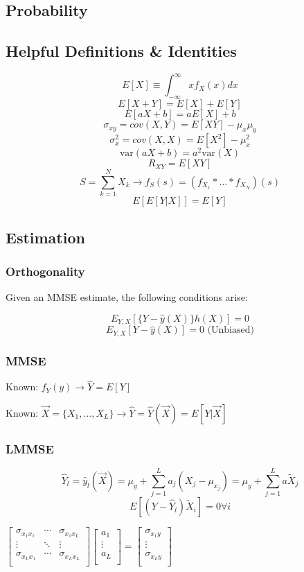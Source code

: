 \documentclass[8pt]{extarticle}
\begin{document}
\begin{multicols*}{3}
\begin{center}
\section{Probability}
\subsection{Helpful Definitions \& Identities}
\[ E[X] \equiv \int_{-\infty}^{\infty} x f_{X}(x) dx \]
\[ E[X+Y] = E[X] + E[Y] \]
\[ E[aX+b] = aE[X] + b \]
\[ \sigma_{xy} = cov(X, Y) = E[XY] - \mu_x \mu_y \]
\[ \sigma_x^2 = cov(X, X) = E[X^2] - \mu_x^2 \]
\[ \text{var}(aX+b) = a^2 \text{var}(X) \]
\[ R_{XY} = E[XY] \]
\[ S = \sum_{k=1}^N X_k \rightarrow f_{S}(s) = (f_{X_1} * \ldots * f_{X_N})(s) \]
\[ E[E[Y|X]] = E[Y] \]

\subsection{Estimation}
\subsubsection{Orthogonality}
Given an MMSE estimate, the following conditions arise:

\[ E_{Y,X}[\{Y-\hat{y}(X)\}h(X)] = 0 \]
\[ E_{Y,X}[Y - \hat{y}(X)] = 0 \text{ (Unbiased)} \]

\subsubsection{MMSE}
Known: \( f_{Y}(y) \rightarrow \hat{Y} = E[Y] \)

Known: \( \vec{X} = \{X_1, \ldots, X_L\} \rightarrow \hat{Y} = \hat{Y}(\vec{X}) = E[Y|\vec{X}] \)

\subsubsection{LMMSE}
\[ \hat{Y}_l = \hat{y}_l(\vec{X}) = \mu_y + \sum_{j=1}^{L} a_j (X_j - \mu_{x_j}) = \mu_y + \sum_{j=1}^{L} a \tilde{X}_j \]
\[ E[(Y-\hat{Y}_l)\tilde{X}_i] = 0 \forall i \]

\(\begin{bmatrix}
\sigma_{x_1 x_1} &\cdots &\sigma_{x_1 x_L} \\
\vdots           &\ddots &\vdots \\
\sigma_{x_L x_1} &\cdots &\sigma_{x_L x_L} \\
\end{bmatrix}
\begin{bmatrix} a_1 \\ \vdots \\ a_L \\ \end{bmatrix}= \begin{bmatrix} \sigma_{x_1 y} \\ \vdots \\ \sigma_{x_L y} \\ \end{bmatrix}\)


\end{center}
\end{multicols*}
\end{document}
